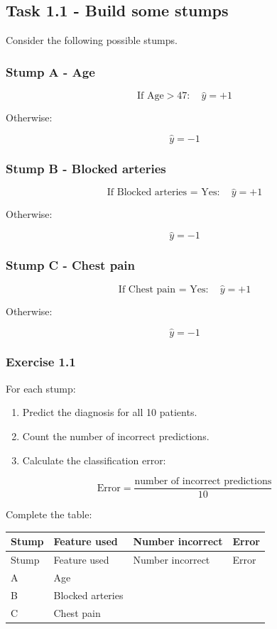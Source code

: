 \documentclass{course_sheet}
\begin{document}
\subsection*{Task 1.1 - Build some stumps}
Consider the following possible stumps.

\subsubsection*{Stump A - Age}
\[
\text{If Age}>47:
\quad \hat y=+1
\]

Otherwise:

\[
\hat y=-1
\]

\subsubsection*{Stump B - Blocked arteries}
\[
\text{If Blocked arteries = Yes}:
\quad \hat y=+1
\]

Otherwise:

\[
\hat y=-1
\]

\subsubsection*{Stump C - Chest pain}
\[
\text{If Chest pain = Yes}:
\quad \hat y=+1
\]

Otherwise:

\[
\hat y=-1
\]

\subsubsection*{Exercise 1.1}
For each stump:

\begin{enumerate}
\item
Predict the diagnosis for all 10 patients.

\item
Count the number of incorrect predictions.

\item
Calculate the classification error:

\end{enumerate}
\[
\text{Error}
=
\frac{\text{number of incorrect predictions}}{10}
\]

Complete the table:

\begingroup
\small
\setlength{\tabcolsep}{4pt}
\begin{longtable}{l|l|l|l}
Stump & Feature used & Number incorrect & Error \\[1.5pt]
\hline
\endfirsthead
Stump & Feature used & Number incorrect & Error \\[1.5pt]
\hline
\endhead
\rule{0pt}{2.4ex}A & Age &  $\phantom{-0.00}$ &  $\phantom{-0.00}$ \\[3pt]
\rule{0pt}{2.4ex}B & Blocked arteries &  $\phantom{-0.00}$ &  $\phantom{-0.00}$ \\[3pt]
\rule{0pt}{2.4ex}C & Chest pain &  $\phantom{-0.00}$ &  $\phantom{-0.00}$ \\[3pt]
\end{longtable}
\endgroup
\clearpage
\end{document}
